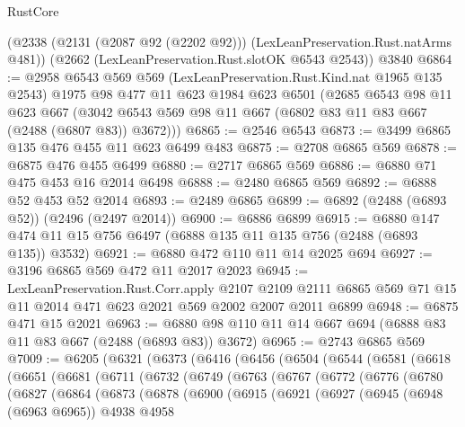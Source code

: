 \begin{lexlean}{RustCore}
\begin{coremodule}
    (@2338 (@2131 (@2087 @92 (@2202 @92))) (LexLeanPreservation.Rust.natArms @481))
    (@2662 (LexLeanPreservation.Rust.slotOK @6543 @2543))
    @3840
@6864 := @2958
    @6543
    @569
    @569
    (LexLeanPreservation.Rust.Kind.nat @1965 @135 @2543)
    @1975
    @98
    @477
    @11
    @623
    @1984
    @623
    @6501
    (@2685
      @6543
      @98
      @11
      @623
      @667
      (@3042 @6543 @569 @98 @11 @667 (@6802 @83 @11 @83 @667 (@2488 (@6807 @83)) @3672)))
@6865 := @2546 @6543
@6873 := @3499 @6865 @135 @476 @455 @11 @623 @6499 @483
@6875 := @2708 @6865 @569
@6878 := @6875 @476 @455 @6499
@6880 := @2717 @6865 @569
@6886 := @6880 @71 @475 @453 @16 @2014 @6498
@6888 := @2480 @6865 @569
@6892 := @6888 @52 @453 @52 @2014
@6893 := @2489 @6865
@6899 := @6892 (@2488 (@6893 @52)) (@2496 (@2497 @2014))
@6900 := @6886 @6899
@6915 := @6880 @147 @474 @11 @15 @756 @6497 (@6888 @135 @11 @135 @756 (@2488 (@6893 @135)) @3532)
@6921 := @6880 @472 @110 @11 @14 @2025 @694
@6927 := @3196 @6865 @569 @472 @11 @2017 @2023
@6945 := LexLeanPreservation.Rust.Corr.apply
    @2107
    @2109
    @2111
    @6865
    @569
    @71
    @15
    @11
    @2014
    @471
    @623
    @2021
    @569
    @2002
    @2007
    @2011
    @6899
@6948 := @6875 @471 @15 @2021
@6963 := @6880 @98 @110 @11 @14 @667 @694 (@6888 @83 @11 @83 @667 (@2488 (@6893 @83)) @3672)
@6965 := @2743 @6865 @569
@7009 := @6205
    (@6321
      (@6373
        (@6416
          (@6456
            (@6504
              (@6544
                (@6581
                  (@6618
                    (@6651
                      (@6681
                        (@6711
                          (@6732
                            (@6749
                              (@6763
                                (@6767
                                  (@6772
                                    (@6776
                                      (@6780
                                        (@6827
                                          (@6864
                                            (@6873
                                              (@6878
                                                (@6900
                                                  (@6915
                                                    (@6921
                                                      (@6927
                                                        (@6945
                                                          (@6948 (@6963 @6965))
                                                          @4938
                                                          @4958

\end{coremodule}
\end{lexlean}
